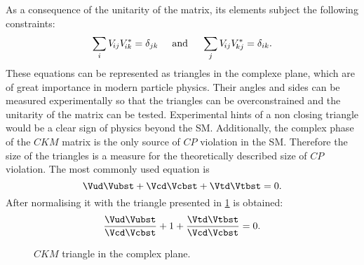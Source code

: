 As a consequence of the unitarity of the matrix, its elements subject the following constraints:
\begin{equation}
\sum_{i} V_{{\kern -0.1em}ij}V_{{\kern -0.1em}ik}^{*} = \delta_{jk}\hspace{0.5cm}\text{and}\hspace{0.5cm}
\sum_{j} V_{{\kern -0.1em}ij}V_{{\kern -0.1em}kj}^{*} = \delta_{ik}.
\end{equation}
These equations can be represented as triangles in the complexe plane, which are of great importance in modern particle physics.
Their angles and sides can be measured experimentally so that the triangles can be overconstrained and the unitarity of
the matrix can be tested. Experimental hints of a non closing triangle would be a clear sign of physics beyond the \ac{SM}.
Additionally, the complex phase of the $CKM$ matrix is the only source of $CP$ violation in the \ac{SM}. Therefore
the size of the triangles is a measure for the theoretically described size of $CP$ violation. The most commonly used equation is
\begin{equation}
\Vud\Vubst + \Vcd\Vcbst + \Vtd\Vtbst = 0.
\end{equation}
After normalising it with \Vcd\Vcbst the triangle presented in \cref{fig:ckmtheory} is obtained:
\begin{equation}
\frac{\Vud\Vubst}{\Vcd\Vcbst} + 1 + \frac{\Vtd\Vtbst}{\Vcd\Vcbst} = 0.
\end{equation}
\begin{figure}[tbp]
	\centering
	
	\caption{$CKM$ triangle in the complex plane.}
	\label{fig:ckmtheory}
\end{figure}
